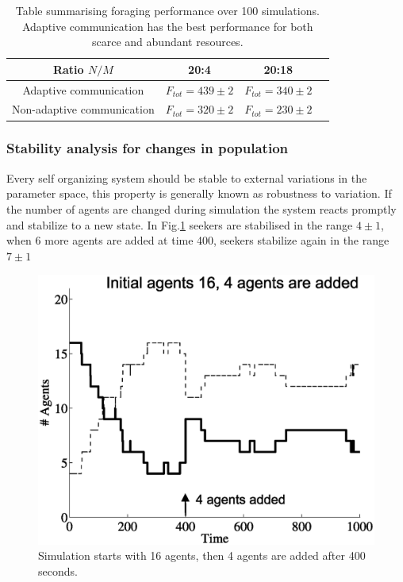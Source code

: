 \begin{table}
\renewcommand{\arraystretch}{1.3}
\caption[Foraging performance with limited resources]{
Table summarising foraging performance over 100 simulations.
Adaptive communication has the best performance for both scarce
and abundant resources.}
\label{tab:limitedperformance}
\begin{center}
\begin{tabular}{@{}cccc@{}}
\hline
\hline
Ratio $N/M$ & 20:4 & 20:18\\
\hline
Adaptive communication & $F_{tot}=439\pm2$ & $F_{tot}=340\pm2$\\
\hline
Non-adaptive communication & $F_{tot}=320\pm2$ & $F_{tot}=230\pm2$\\
\end{tabular}
\end{center}
\end{table}

\subsubsection{Stability analysis for changes in population}
Every self organizing system should be stable to external variations in the 
parameter space, this property is generally known as robustness to variation.
If the number of agents are changed during simulation the system reacts promptly
and stabilize to a new state. In Fig.\ref{fig:agentAdd} seekers are stabilised
in the range $4\pm1$, when 6 more agents are added at time 400,
seekers stabilize again in the range $7\pm1$

\begin{figure}[htb]
\begin{centering}
\includegraphics[width=0.6 \textwidth]{figures/socialadapt/limited/agent4more.eps}
\small{
\caption[Self organisation sensitivity to agent parameters]{
Simulation starts with 16 agents, then 4 agents are added
after 400 seconds.\label{fig:agentAdd}}
}
\end{centering}
\end{figure}


